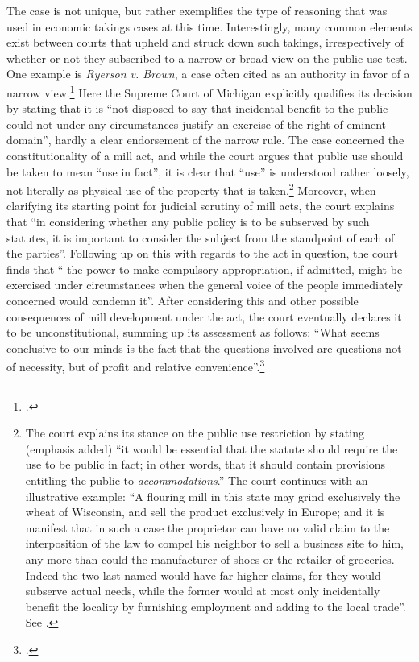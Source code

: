 The case is not unique, but rather exemplifies the type of reasoning that was used in economic takings cases at this time. Interestingly, many common elements exist between courts that upheld and struck down such takings, irrespectively of whether or not they subscribed to a narrow or broad view on the public use test. One example is {\it Ryerson v. Brown}, a case often cited as an authority in favor of a narrow view.\footcite{ryerson77} Here the Supreme Court of Michigan explicitly qualifies its decision by stating that it is ``not disposed to say that incidental benefit to the public could not under any circumstances justify an exercise of the right of eminent domain'', hardly a clear endorsement of the narrow rule. The case concerned the constitutionality of a mill act, and while the court argues that public use should be taken to mean ``use in fact'', it is clear that ``use'' is understood rather loosely, not literally as physical use of the property that is taken.\footnote{The court explains its stance on the public use restriction by stating (emphasis added) ``it would be essential that the statute should require the use to be public in fact; in other words, that it should contain provisions entitling the public to {\it accommodations}.'' The court continues with an illustrative example: ``A flouring mill in this state may grind exclusively the wheat of Wisconsin, and sell the product exclusively in Europe; and it is manifest that in such a case the proprietor can have no valid claim to the interposition of the law to compel his neighbor to sell a business site to him, any more than could the manufacturer of shoes or the retailer of groceries. Indeed the two last named would have far higher claims, for they would subserve actual needs, while the former would at most only incidentally benefit the locality by furnishing employment and adding to the local trade''. See \cite[336]{ryerson77}.} Moreover, when clarifying its starting point for judicial scrutiny of mill acts, the court explains that ``in considering whether any public policy is to be subserved by such statutes, it is important to consider the subject from the standpoint of each of the parties''. Following up on this with regards to the act in question, the court finds that `` the power to make compulsory appropriation, if admitted, might be exercised under circumstances when the general voice of the people immediately concerned would condemn it''. After considering this and other possible consequences of mill development under the act, the court eventually declares it to be unconstitutional, summing up its assessment as follows: ``What seems conclusive to our minds is the fact that the questions involved are questions not of necessity, but of profit and relative convenience''.\footcite[336]{ryerson77}

